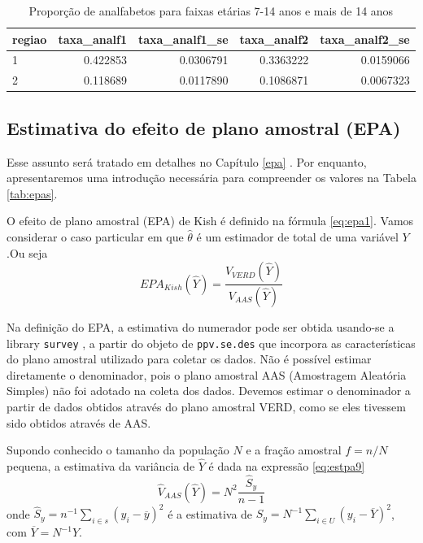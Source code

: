 \documentclass[]{book}
\theoremstyle{definition}
\theoremstyle{definition}
\theoremstyle{definition}
\theoremstyle{remark}
\begin{document}
\begin{table}

\caption{\label{tab:unnamed-chunk-11}Proporção de analfabetos para faixas etárias 7-14 anos e mais de 14 anos}
\centering
\begin{tabular}[t]{lrrrr}
\toprule
regiao & taxa\_analf1 & taxa\_analf1\_se & taxa\_analf2 & taxa\_analf2\_se\\
\midrule
1 & 0.422853 & 0.0306791 & 0.3363222 & 0.0159066\\
2 & 0.118689 & 0.0117890 & 0.1086871 & 0.0067323\\
\bottomrule
\end{tabular}
\end{table}

\subsection{Estimativa do efeito de plano amostral
(EPA)}\label{estimativa-do-efeito-de-plano-amostral-epa}

Esse assunto será tratado em detalhes no Capítulo \ref{epa} . Por
enquanto, apresentaremos uma introdução necessária para compreender os
valores na Tabela \ref{tab:epas}.

O efeito de plano amostral (EPA) de Kish é definido na fórmula
\eqref{eq:epa1}. Vamos considerar o caso particular em que
\(\hat{\theta}\) é um estimador de total de uma variável \(Y\).Ou seja
\[
EPA_{Kish}\left(\widehat{Y}\right)=\frac{V_{VERD}\left(\widehat{Y}\right)}{V_{AAS}\left(\widehat{Y}\right)}
\]

Na definição do EPA, a estimativa do numerador pode ser obtida usando-se
a library \texttt{survey} \citep{R-survey}, a partir do objeto de
\texttt{ppv.se.des} que incorpora as características do plano amostral
utilizado para coletar os dados. Não é possível estimar diretamente o
denominador, pois o plano amostral AAS (Amostragem Aleatória Simples)
não foi adotado na coleta dos dados. Devemos estimar o denominador a
partir de dados obtidos através do plano amostral VERD, como se eles
tivessem sido obtidos através de AAS.

Supondo conhecido o tamanho da população \(N\) e a fração amostral
\(f=n/N\) pequena, a estimativa da variância de \(\widehat{Y}\) é dada
na expressão \eqref{eq:estpa9} \[
\widehat{V}_{AAS}\left(\widehat{Y}\right)=N^2\frac{\widehat{S}_y}{n-1}
\] onde
\(\widehat{S}_y= n^{-1}\sum_{i\in s}\left(y_i-\overline{y}\right)^2\) é
a estimativa de
\(S_y=N^{-1}\sum_{i\in U}\left(y_i-\overline{Y}\right)^2\), com
\(\overline{Y}=N^{-1}Y\).
\end{document}
